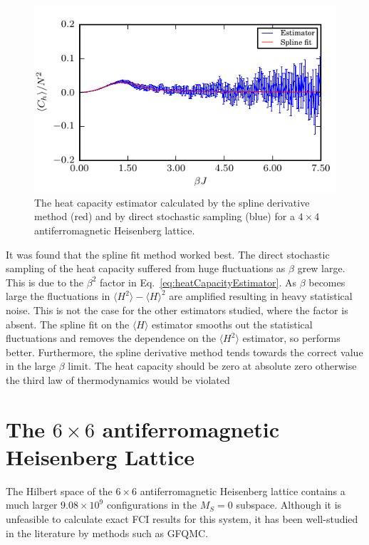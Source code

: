 \begin{figure}[H]
\begin{center}
\includegraphics[width =1\textwidth]{4x4spline_spec_heat.pdf}
\caption[The heat capacity estimator calculated by the spline derivative method (red) and by direct stochastic sampling (blue) for a $4\times4$ antiferromagnetic Heisenberg lattice with no applied magnetic field]{The heat capacity estimator calculated by the spline derivative method (red) and by direct stochastic sampling (blue) for a $4\times4$ antiferromagnetic Heisenberg lattice.}
\label{fig:4x4spline_spec_heat}
\end{center}
\end{figure}

It was found that the spline fit method worked best. The direct stochastic sampling of the heat capacity suffered from huge fluctuations as $\beta$ grew large. This is due to the $\beta^2$ factor in Eq.~\ref{eq:heatCapacityEstimator}. As $\beta$ becomes large the fluctuations in $\langle H^2\rangle-\langle H\rangle^2$ are amplified resulting in heavy statistical noise. This is not the case for the other estimators studied, where the factor is absent. The spline fit on the $\langle H \rangle$ estimator smooths out the statistical fluctuations and removes the dependence on the $\langle H^2\rangle$ estimator, so performs better. Furthermore, the spline derivative method tends towards the correct value in the large $\beta$ limit. The heat capacity should be zero at absolute zero otherwise the third law of thermodynamics would be violated

\section{The $6\times6$ antiferromagnetic Heisenberg Lattice}
The Hilbert space of the $6\times6$ antiferromagnetic Heisenberg lattice contains a much larger $9.08\times10^9$ configurations in the $M_S = 0$ subspace. Although it is unfeasible to calculate exact FCI results for this system, it has been well-studied in the literature by methods such as GFQMC.

